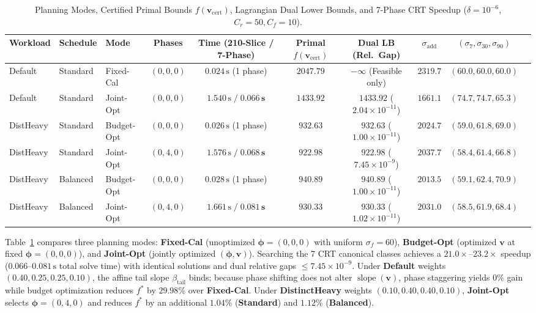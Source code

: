 \documentclass[sigconf, nonacm]{acmart}
\begin{document}
\begin{table}[t]
\centering
\caption{Planning Modes, Certified Primal Bounds $f(\mathbf{v}_{\mathrm{cert}})$, Lagrangian Dual Lower Bounds, and 7-Phase CRT Speedup ($\delta = 10^{-6}$, $C_r=50, C_f=10$).}
\label{tab:planner_bounds}
\small
\setlength{\tabcolsep}{4.5pt}
\begin{tabular}{@{}lllccccccc@{}}
\toprule
\textbf{Workload} & \textbf{Schedule} & \textbf{Mode} & \textbf{Phases} & \textbf{Time (210-Slice / 7-Phase)} & \textbf{Primal $f(\mathbf{v}_{\mathrm{cert}})$} & \textbf{Dual LB (Rel.\ Gap)} & $\sigma_{\mathrm{add}}$ & $(\sigma_7, \sigma_{30}, \sigma_{90})$ \\ \midrule
Default & Standard & Fixed-Cal & $(0,0,0)$ & $0.024\,\text{s}$ (1 phase) & $2047.79$ & $-\infty$ (Feasible only) & $2319.7$ & $(60.0, 60.0, 60.0)$ \\
Default & Standard & Joint-Opt & $(0,0,0)$ & $1.540\,\text{s} \;/\; \mathbf{0.066\,\text{s}}$ & $\mathbf{1433.92}$ & $1433.92$ ($2.04\times 10^{-11}$) & $1661.1$ & $(74.7, 74.7, 65.3)$ \\
DistHeavy & Standard & Budget-Opt & $(0,0,0)$ & $0.026\,\text{s}$ (1 phase) & $932.63$ & $932.63$ ($1.00\times 10^{-11}$) & $2024.7$ & $(59.0, 61.8, 69.0)$ \\
DistHeavy & Standard & Joint-Opt & $(0,4,0)$ & $1.576\,\text{s} \;/\; \mathbf{0.068\,\text{s}}$ & $\mathbf{922.98}$ & $922.98$ ($7.45\times 10^{-9}$) & $2037.7$ & $(58.4, 61.4, 66.8)$ \\
DistHeavy & Balanced & Budget-Opt & $(0,0,0)$ & $0.028\,\text{s}$ (1 phase) & $940.89$ & $940.89$ ($1.00\times 10^{-11}$) & $2013.5$ & $(59.1, 62.4, 70.9)$ \\
DistHeavy & Balanced & Joint-Opt & $(0,4,0)$ & $1.661\,\text{s} \;/\; \mathbf{0.081\,\text{s}}$ & $\mathbf{930.33}$ & $930.33$ ($1.02\times 10^{-11}$) & $2031.0$ & $(58.5, 61.9, 68.4)$ \\ \bottomrule
\end{tabular}
\end{table}

Table~\ref{tab:planner_bounds} compares three planning modes: \textbf{Fixed-Cal} (unoptimized $\boldsymbol{\phi}=(0,0,0)$ with uniform $\sigma_f=60$), \textbf{Budget-Opt} (optimized $\mathbf{v}$ at fixed $\boldsymbol{\phi}=(0,0,0)$), and \textbf{Joint-Opt} (jointly optimized $(\boldsymbol{\phi}, \mathbf{v})$). Searching the 7 CRT canonical classes achieves a $21.0\times\text{--}23.2\times$ speedup ($0.066\text{--}0.081\,\text{s}$ total solve time) with identical solutions and dual relative gaps $\le 7.45 \times 10^{-9}$. Under \textbf{Default} weights $(0.40, 0.25, 0.25, 0.10)$, the affine tail slope $\beta_{\mathrm{tail}}$ binds; because phase shifting does not alter $\operatorname{slope}(\mathbf{v})$, phase staggering yields $0\%$ gain while budget optimization reduces $f^*$ by $29.98\%$ over \textbf{Fixed-Cal}. Under \textbf{DistinctHeavy} weights $(0.10, 0.40, 0.40, 0.10)$, \textbf{Joint-Opt} selects $\boldsymbol{\phi}=(0,4,0)$ and reduces $f^*$ by an additional $1.04\%$ (\textbf{Standard}) and $1.12\%$ (\textbf{Balanced}).
\end{document}
